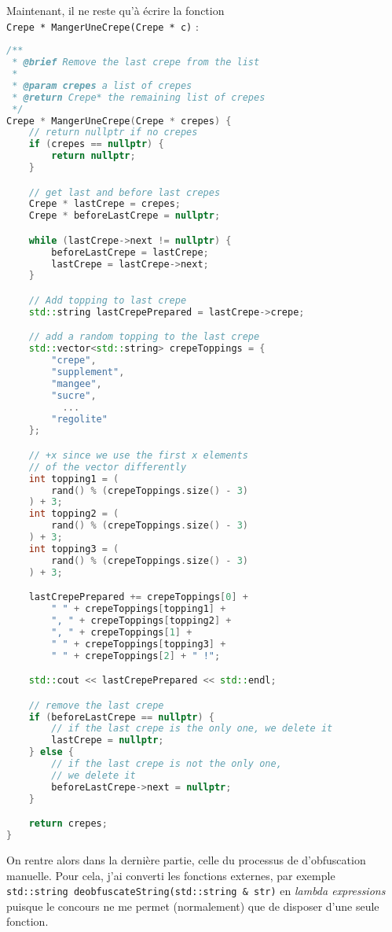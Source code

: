 \documentclass[12pt]{article} %
\begin{document}
Maintenant, il ne reste qu'à écrire la fonction \\ \verb|Crepe * MangerUneCrepe(Crepe * c)| :
\begin{lstlisting}[language=C++]
/**
 * @brief Remove the last crepe from the list
 * 
 * @param crepes a list of crepes
 * @return Crepe* the remaining list of crepes
 */
Crepe * MangerUneCrepe(Crepe * crepes) {
    // return nullptr if no crepes
    if (crepes == nullptr) {
        return nullptr;
    }

    // get last and before last crepes
    Crepe * lastCrepe = crepes;
    Crepe * beforeLastCrepe = nullptr;

    while (lastCrepe->next != nullptr) {
        beforeLastCrepe = lastCrepe;
        lastCrepe = lastCrepe->next;
    }

    // Add topping to last crepe
    std::string lastCrepePrepared = lastCrepe->crepe;

    // add a random topping to the last crepe
    std::vector<std::string> crepeToppings = {
        "crepe",
        "supplement",
        "mangee",
        "sucre",
          ...
        "regolite"
    };

    // +x since we use the first x elements
    // of the vector differently
    int topping1 = (
        rand() % (crepeToppings.size() - 3)
    ) + 3; 
    int topping2 = (
        rand() % (crepeToppings.size() - 3)
    ) + 3;
    int topping3 = (
        rand() % (crepeToppings.size() - 3)
    ) + 3;

    lastCrepePrepared += crepeToppings[0] + 
        " " + crepeToppings[topping1] + 
        ", " + crepeToppings[topping2] + 
        ", " + crepeToppings[1] + 
        " " + crepeToppings[topping3] +
        " " + crepeToppings[2] + " !";

    std::cout << lastCrepePrepared << std::endl;

    // remove the last crepe
    if (beforeLastCrepe == nullptr) {
        // if the last crepe is the only one, we delete it
        lastCrepe = nullptr;
    } else {
        // if the last crepe is not the only one, 
        // we delete it
        beforeLastCrepe->next = nullptr;
    }

    return crepes;
}
\end{lstlisting}

On rentre alors dans la dernière partie, celle du processus de d'obfuscation manuelle. Pour cela, j'ai converti les fonctions externes, par exemple \\ \verb|std::string deobfuscateString(std::string & str)| en \textit{lambda expressions} puisque le concours ne me permet (normalement) que de disposer d'une seule fonction.
\end{document}
